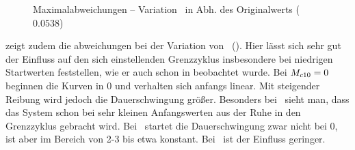 \begin{figure}[htbp]
	\caption{Maximalabweichungen -- Variation \Mceo\ in Abh. des Originalwerts ($0.0538$)}
	\label{fig:sysvarMc10m}
\end{figure}

 zeigt zudem die \ap abweichungen bei der Variation von \Mceo\ (\zm).
Hier lässt sich sehr gut der Einfluss auf den sich einstellenden Grenzzyklus insbesondere bei niedrigen Startwerten feststellen, wie er auch schon in  beobachtet wurde.
Bei $M_{c10}=0$ beginnen die Kurven in 0 und verhalten sich anfangs linear.
Mit steigender Reibung wird jedoch die Dauerschwingung größer.
Besonders bei \apv\ sieht man, dass das System schon bei sehr kleinen Anfangswerten aus der Ruhe in den Grenzzyklus gebracht wird.
Bei \apz\ startet die Dauerschwingung zwar nicht bei 0, ist aber im Bereich von 2-3 bis etwa  konstant.
Bei \apd\ ist der Einfluss geringer.





